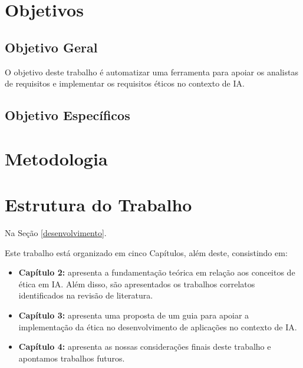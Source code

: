 
\section{Objetivos}
\subsection{Objetivo Geral}

O objetivo deste trabalho é automatizar uma ferramenta para apoiar os analistas de requisitos e implementar os requisitos éticos no contexto de IA. 

\subsection{Objetivo Específicos}

\section{Metodologia}


\section{Estrutura do Trabalho}
Na Seção \ref{desenvolvimento}.



Este trabalho está organizado em cinco Capítulos, além deste, consistindo em:
\begin{itemize}

    \item \textbf{Capítulo 2:} apresenta a fundamentação teórica em relação aos conceitos de ética em IA. Além disso, são apresentados os trabalhos correlatos identificados na revisão de literatura.

    \item \textbf{Capítulo 3:} apresenta uma proposta de um guia para apoiar a implementação da ética no desenvolvimento de aplicações no contexto de IA.

    \item \textbf{Capítulo 4:} apresenta as nossas considerações finais deste trabalho e apontamos trabalhos futuros.


\end{itemize}